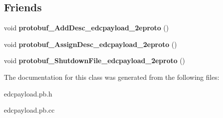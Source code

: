 \subsection*{Friends}
\begin{DoxyCompactItemize}
\item 
\hypertarget{classedcdatatypes_1_1_edc_payload_ad13cfbf79a53586d1a436cf24430949c}{void {\bfseries protobuf\-\_\-\-Add\-Desc\-\_\-edcpayload\-\_\-2eproto} ()}\label{classedcdatatypes_1_1_edc_payload_ad13cfbf79a53586d1a436cf24430949c}

\item 
\hypertarget{classedcdatatypes_1_1_edc_payload_ab647c246a2851f27e483b2ddb5dac445}{void {\bfseries protobuf\-\_\-\-Assign\-Desc\-\_\-edcpayload\-\_\-2eproto} ()}\label{classedcdatatypes_1_1_edc_payload_ab647c246a2851f27e483b2ddb5dac445}

\item 
\hypertarget{classedcdatatypes_1_1_edc_payload_aaa1f6cfe98731937eb4a2c1c2a368990}{void {\bfseries protobuf\-\_\-\-Shutdown\-File\-\_\-edcpayload\-\_\-2eproto} ()}\label{classedcdatatypes_1_1_edc_payload_aaa1f6cfe98731937eb4a2c1c2a368990}

\end{DoxyCompactItemize}


The documentation for this class was generated from the following files\-:\begin{DoxyCompactItemize}
\item 
edcpayload.\-pb.\-h\item 
edcpayload.\-pb.\-cc\end{DoxyCompactItemize}
